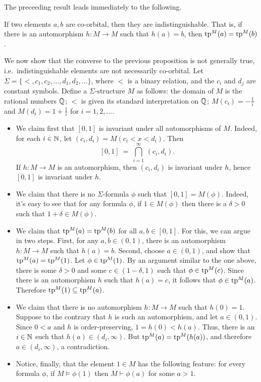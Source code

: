The preceeding result leads immediately to the following.

\begin{prop} If two elements $a,b$ are co-orbital, then they are
  indistinguishable.  That is, if there is an automorphism $h:M\to M$
  such that $h(a)=b$, then $\mathrm{tp}^{M}(a)=\mathrm{tp}^{M}(b)$. \end{prop}

\begin{example} \label{fragment} We now show that the converse to the
  previous proposition is not generally true, i.e.\ indistinguishable
  elements are not necessarily co-orbital.  Let
  $\Sigma = \{ <,c_1,c_2,\dots ,d_1,d_2,\dots \}$, where $<$ is a
  binary relation, and the $c_i$ and $d_j$ are constant symbols.
  Define a $\Sigma$-structure $M$ as follows: the domain of $M$
  is the rational numbers $\mathbb Q$; $<$ is given its standard
  interpretation on $\mathbb Q$; $M(c_i)=-\frac{1}{i}$ and
  $M(d_i)=1+\frac{1}{i}$ for $i=1,2,\dots $.  \begin{itemize}
  \item We claim first that $[0,1]$ is invariant under all
    automorphisms of $M$.  Indeed, for each $i\in \mathbb N$, let
    $(c_i,d_i)=M(c_i<x<d_i)$.  Then
  \[ [0,1] \: = \: \bigcap _{i=1}^{\infty} \, (c_i,d_i) .\] If
  $h:M\to M$ is an automorphism, then $(c_i,d_i)$ is invariant under
  $h$, hence $[0,1]$ is invariant under $h$.
\item We claim that there is no $\Sigma$-formula $\phi$ such that
  $[0,1]=M(\phi )$.  Indeed, it's easy to see that for any formula
  $\phi$, if $1\in M(\phi )$ then there is a $\delta>0$ such that
  $1+\delta \in M(\phi )$.
\item We claim that $\mathrm{tp}^{M}(a)=\mathrm{tp}^{M}(b)$ for all $a,b\in [0,1]$.  For
  this, we can argue in two steps.  First, for any $a,b\in (0,1)$,
  there is an automorphism $h:M\to M$ such that $h(a)=b$.  Second,
  choose $a\in (0,1)$, and show that $\mathrm{tp}^{M}(a)=\mathrm{tp}^{M}(1)$.  Let
  $\phi\in\mathrm{tp}^{M}(1)$.  By an argument similar to the one above, there
  is some $\delta>0$ and some $c\in (1-\delta ,1)$ such that
  $\phi\in\mathrm{tp}^{M}(c)$.  Since there is an automorphism $h$ such that
  $h(a)=c$, it follows that $\phi\in\mathrm{tp}^{M}(a)$.  Therefore
  $\mathrm{tp}^{M}(1)\subseteq \mathrm{tp}^{M}(a)$.
\item We claim that there is no automorphism $h:M\to M$ such that
  $h(0)=1$.  Suppose to the contrary that $h$ is such an automorphism,
  and let $a\in (0,1)$.  Since $0<a$ and $h$ is order-preserving,
  $1=h(0)<h(a)$.  Thus, there is an $i\in\mathbb N$ such that
  $h(a)\in (d_i,\infty )$.  But $\mathrm{tp}^{M}(a)=\mathrm{tp}^{M}(h(a))$, and
  therefore $a\in (d_i,\infty )$, a
  contradiction.
\item Notice, finally, that the element $1\in M$ has the following
  feature: for every formula $\phi$, if $M\vDash \phi (1)$ then
  $M\vdash \phi (a)$ for some $a>1$.  \end{itemize} \end{example}


